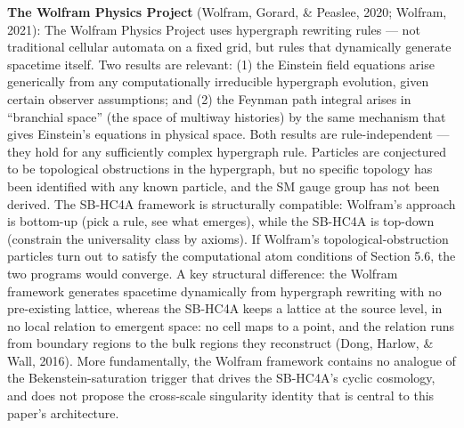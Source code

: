 \documentclass[
]{article}
\begin{document}
\textbf{The Wolfram Physics Project} (Wolfram, Gorard, \& Peaslee, 2020;
Wolfram, 2021): The Wolfram Physics Project uses hypergraph rewriting
rules --- not traditional cellular automata on a fixed grid, but rules
that dynamically generate spacetime itself. Two results are relevant:
(1) the Einstein field equations arise generically from any
computationally irreducible hypergraph evolution, given certain observer
assumptions; and (2) the Feynman path integral arises in ``branchial
space'' (the space of multiway histories) by the same mechanism that
gives Einstein's equations in physical space. Both results are
rule-independent --- they hold for any sufficiently complex hypergraph
rule. Particles are conjectured to be topological obstructions in the
hypergraph, but no specific topology has been identified with any known
particle, and the SM gauge group has not been derived. The SB-HC4A
framework is structurally compatible: Wolfram's approach is bottom-up
(pick a rule, see what emerges), while the SB-HC4A is top-down
(constrain the universality class by axioms). If Wolfram's
topological-obstruction particles turn out to satisfy the computational
atom conditions of Section 5.6, the two programs would converge. A key
structural difference: the Wolfram framework generates spacetime
dynamically from hypergraph rewriting with no pre-existing lattice,
whereas the SB-HC4A keeps a lattice at the source level, in no local
relation to emergent space: no cell maps to a point, and the relation
runs from boundary regions to the bulk regions they reconstruct (Dong,
Harlow, \& Wall, 2016). More fundamentally, the Wolfram framework
contains no analogue of the Bekenstein-saturation trigger that drives
the SB-HC4A's cyclic cosmology, and does not propose the cross-scale
singularity identity that is central to this paper's architecture.
\end{document}
